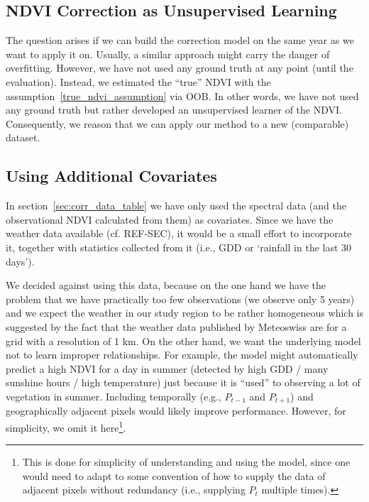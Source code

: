 {{    }

    \subsection{NDVI Correction as Unsupervised Learning}
        The question arises if we can build the correction model on the same year as we want to apply it on. Usually, a similar approach might carry the danger of overfitting. However, we have not used any ground truth at any point (until the evaluation). Instead, we estimated the ``true'' NDVI with the assumption~\ref{true_ndvi_assumption} via OOB. In other words, we have not used any ground truth but rather developed an unsupervised learner of the NDVI. Consequently, we reason that we can apply our method to a new (comparable) dataset.
    \subsection{Using Additional Covariates}{
        In section~\ref{sec:corr_data_table} we have only used the spectral data (and the observational NDVI calculated from them) as covariates. Since we have the weather data available (cf. REF-SEC), it would be a small effort to incorporate it, together with statistics collected from it (i.e., GDD or `rainfall in the last 30 days'). 

        We decided against using this data, because on the one hand we have the problem that we have practically too few observations (we observe only 5 years) and we expect the weather in our study region to be rather homogeneous which is suggested by the fact that the weather data published by Meteoswiss are for a grid with a resolution of 1 km. On the other hand, we want the underlying model not to learn improper relationships. For example, the model might automatically predict a high NDVI for a day in summer (detected by high GDD / many sunshine hours / high temperature) just because it is ``used'' to observing a lot of vegetation in summer. 
        Including temporally (e.g., $P_{t-1}$ and $P_{t+1}$) and geographically adjacent pixels would likely improve performance. However, for simplicity, we omit it here\footnote{This is done for simplicity of understanding and using the model, since one would need to adapt to some convention of how to supply the data of adjacent pixels without redundancy (i.e., supplying $P_t$ multiple times).}.
}
}

